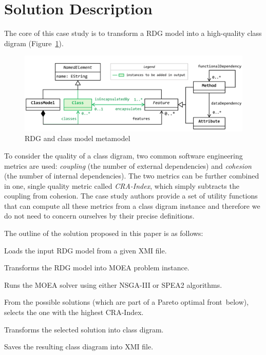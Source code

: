 
\section{Solution Description}
\label{sec:SolutionDescription}

The core of this case study is to transform a RDG model into a high-quality class digram (\Cf Figure~\ref{fig:Metamodel}).

\begin{figure}[h!tb]
  \centering
  \includegraphics[width=.6\textwidth]{figures/metamodel.pdf}
  \caption{RDG and class model metamodel}
  \label{fig:Metamodel}
\end{figure}

To consider the quality of a class digram, two common software engineering metrics are used: \emph{coupling} (the number of external dependencies) and \emph{cohesion} (the number of internal dependencies).
The two metrics can be further combined in one, single quality metric called \emph{CRA-Index}, which simply subtracts the coupling from cohesion.
The case study authors provide a set of utility functions that can compute all these metrics from a class digram instance and therefore we do not need to concern ourselves by their precise definitions.

The outline of the solution proposed in this paper is as follows:

\begin{compactenum}
  \item Loads the input RDG model from a given XMI file.
  \item Transforms the RDG model into MOEA problem instance.
  \item Runs the MOEA solver using either NSGA-III or SPEA2 algorithms.
  \item From the possible solutions (which are part of a Pareto optimal front~\Cf below), selects the one with the highest CRA-Index.
  \item Transforms the selected solution into class digram.
  \item Saves the resulting class diagram into XMI file.
\end{compactenum}

